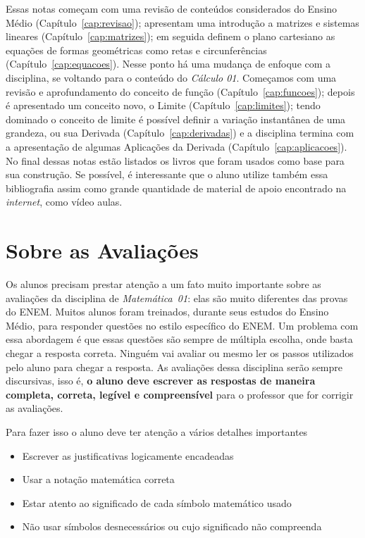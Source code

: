 Essas notas começam com uma revisão de conteúdos considerados do Ensino Médio (Capítulo~\ref{cap:revisao});
apresentam uma introdução a matrizes e sistemas lineares (Capítulo~\ref{cap:matrizes});
em seguida definem o plano cartesiano as equações de formas geométricas como retas e circunferências (Capítulo~\ref{cap:equacoes}).
Nesse ponto há uma mudança de enfoque com a disciplina, se voltando para o conteúdo do \emph{Cálculo 01}.
Começamos com uma revisão e aprofundamento do conceito de função (Capítulo~\ref{cap:funcoes});
depois é apresentado um conceito novo, o Limite (Capítulo~\ref{cap:limites});
tendo dominado o conceito de limite é possível definir a variação instantânea de uma grandeza, ou sua Derivada (Capítulo~\ref{cap:derivadas}) e
a disciplina termina com a apresentação de algumas Aplicações da Derivada (Capítulo~\ref{cap:aplicacoes}).
No final dessas notas estão listados os livros que foram usados como base para sua construção.
Se possível, é interessante que o aluno utilize também essa bibliografia assim como grande quantidade
de material de apoio encontrado na \emph{internet}, como vídeo aulas.

\section*{Sobre as Avaliações}

Os alunos precisam prestar atenção a um fato muito importante sobre as avaliações da disciplina de \emph{Matemática~01}:
elas são muito diferentes das provas do ENEM.
Muitos alunos foram treinados, durante seus estudos do Ensino Médio, para responder questões
no estilo específico do ENEM. Um problema com essa abordagem é que essas questões são
sempre de múltipla escolha, onde basta chegar a resposta correta. Ninguém
vai avaliar ou mesmo ler os passos utilizados pelo aluno para chegar a resposta.
As avaliações dessa disciplina serão sempre discursivas, isso é, \textbf{o aluno deve escrever
as respostas de maneira completa, correta, legível e compreensível} para o professor que
for corrigir as avaliações.

Para fazer isso o aluno deve ter atenção a vários detalhes importantes
\begin{itemize}
    \item Escrever as justificativas logicamente encadeadas
    \item Usar a notação matemática correta
    \item Estar atento ao significado de cada símbolo matemático usado
    \item Não usar símbolos desnecessários ou cujo significado não compreenda
\end{itemize}

